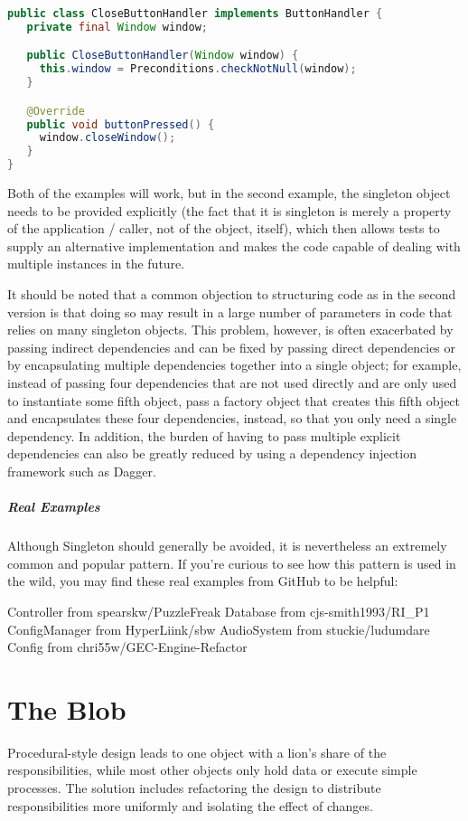 \documentclass{book}
\begin{document}
\begin{lstlisting}[caption={GOOD: Allows dependency to be supplied explicitly}, language=Java]
public class CloseButtonHandler implements ButtonHandler {
   private final Window window;

   public CloseButtonHandler(Window window) {
     this.window = Preconditions.checkNotNull(window);
   }

   @Override
   public void buttonPressed() {
     window.closeWindow();
   }
}
\end{lstlisting}    

Both of the examples will work, but in the second example, the singleton object needs to be provided explicitly (the fact that it is singleton is merely a property of the application / caller,
not of the object, itself), which then allows tests to supply an alternative implementation and makes the code capable of dealing with multiple instances in the future.

It should be noted that a common objection to structuring code as in the second version is that doing so may result in a large number of parameters in code that relies on many singleton objects.
This problem, however, is often exacerbated by passing indirect dependencies and can be fixed by passing direct dependencies or by encapsulating multiple dependencies together into a single object;
for example, instead of passing four dependencies that are not used directly and are only used to instantiate some fifth object,
pass a factory object that creates this fifth object and encapsulates these four dependencies, instead, so that you only need a single dependency.
In addition, the burden of having to pass multiple explicit dependencies can also be greatly reduced by using a dependency injection framework such as Dagger.
\paragraph{Real Examples}

Although Singleton should generally be avoided, it is nevertheless an extremely common and popular pattern.
If you're curious to see how this pattern is used in the wild, you may find these real examples from GitHub to be helpful:

    Controller from spearskw/PuzzleFreak
    Database from cjs-smith1993/RI\_P1
    ConfigManager from HyperLiink/sbw
    AudioSystem from stuckie/ludumdare
    Config from chri55w/GEC-Engine-Refactor

\chapter{The Blob}
Procedural-style design leads to one object with a lion’s share of the responsibilities, while most other objects only hold data or execute simple processes.
The solution includes refactoring the design to distribute responsibilities more uniformly and isolating the effect of changes.
\end{document}
